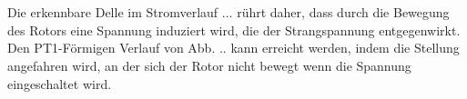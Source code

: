 \chapter{}\label{ex:aufg4}

\section{}\label{sec:aufg4a}



\section{}\label{sec:aufg4b}
Die erkennbare Delle im Stromverlauf ... rührt daher, dass durch die Bewegung des Rotors eine Spannung induziert wird, die der Strangspannung entgegenwirkt. Den PT1-Förmigen Verlauf von Abb. .. kann erreicht werden, indem die Stellung angefahren wird, an der sich der Rotor nicht bewegt wenn die Spannung eingeschaltet wird.

\clearpage